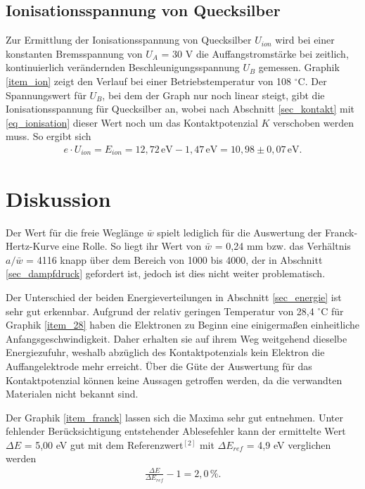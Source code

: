 \subsection{Ionisationsspannung von Quecksilber}
\label{sec_ionisation}
Zur Ermittlung der Ionisationsspannung von Quecksilber $U_{ion}$ wird bei einer konstanten Bremsspannung von $U_A$ = 30 V die Auffangstromstärke
bei zeitlich, kontinuierlich verändernden Beschleunigungsspannung $U_B$ gemessen. Graphik \ref{item_ion} zeigt den Verlauf bei einer
Betriebstemperatur von 108 $^{\circ}$C. Der Spannungswert für $U_B$, bei dem der Graph nur noch linear steigt, gibt die Ionisationsspannung
für Quecksilber an, wobei nach Abschnitt \ref{sec_kontakt} mit \eqref{eq_ionisation} dieser Wert noch um das Kontaktpotenzial $K$ verschoben
werden muss. So ergibt sich
\begin{align}
 e \cdot U_{ion} = E_{ion} = 12,72 \, \text{eV} - 1,47 \, \text{eV} = 10,98 \pm 0,07 \, \text{eV}.
\end{align}


\section{Diskussion}
Der Wert für die freie Weglänge $\bar w$ spielt lediglich für die Auswertung der Franck-Hertz-Kurve eine Rolle. So liegt ihr Wert von
$\bar w$ = 0,24 mm bzw. das Verhältnis $a/\bar w$ = 4116 knapp über dem Bereich von 1000 bis 4000, der in Abschnitt \ref{sec_dampfdruck} 
gefordert ist, jedoch ist dies nicht weiter problematisch.

Der Unterschied der beiden Energieverteilungen in Abschnitt \ref{sec_energie} ist sehr gut erkennbar. Aufgrund der relativ geringen
Temperatur von 28,4 $^\circ$C für Graphik \ref{item_28} haben die Elektronen zu Beginn eine einigermaßen einheitliche Anfangsgeschwindigkeit.
Daher erhalten sie auf ihrem Weg weitgehend dieselbe Energiezufuhr, weshalb abzüglich des Kontaktpotenzials kein Elektron die Auffangelektrode
mehr erreicht. Über die Güte der Auswertung für das Kontaktpotenzial können keine Aussagen getroffen werden, da die verwandten Materialen
nicht bekannt sind.

Der Graphik \ref{item_franck} lassen sich die Maxima sehr gut entnehmen. Unter fehlender Berücksichtigung entstehender Ablesefehler kann
der ermittelte Wert $\Delta E$ = 5,00 eV gut mit dem Referenzwert$^{[2]}$ mit $\Delta E_{ref}$ = 4,9 eV verglichen werden
\begin{align}
 \frac{\Delta E}{\Delta E_{ref}} - 1 = 2,0\,\%.
\end{align}

